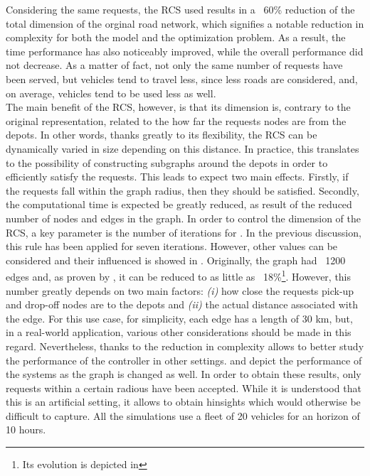  Considering the same requests, the RCS used results in a ~60\% reduction of the total dimension of the orginal road network, which signifies a notable reduction in complexity for both the model and the optimization problem. As a result, the time performance has also noticeably improved, while the overall performance did not decrease. As a matter of fact, not only the same number of requests have been served, but vehicles tend to travel less, since less roads are considered, and, on average, vehicles tend to be used less as well. \\
The main benefit of the RCS, however, is that its dimension is, contrary to the original representation, related to the how far the requests nodes are from the depots. In other words, thanks greatly to its flexibility, the RCS can be dynamically varied in size depending on this distance. In practice, this translates to the possibility of constructing subgraphs around the depots in order to efficiently satisfy the requests. This leads to expect two main effects. Firstly, if the requests fall within the graph radius, then they should be satisfied. Secondly, the computational time is expected be greatly reduced, as result of the reduced number of nodes and edges in the graph. In order to control the dimension of the RCS, a key parameter is the number of iterations for . In the previous discussion, this rule has been applied for seven iterations. However, other values can be considered and their influenced is showed in . Originally, the graph had ~1200 edges and, as proven by , it can be reduced to as little as ~18\%\footnote{Its evolution is depicted in }. However, this number greatly depends on two main factors: \textit{(i)} how close the requests pick-up and drop-off nodes are to the depots and \textit{(ii)} the actual distance associated with the edge. For this use case, for simplicity, each edge has a length of 30 km, but, in a real-world application, various other considerations should be made in this regard. Nevertheless, thanks to the reduction in complexity allows to better study the performance of the controller in other settings.  and  depict the performance of the systems as the graph is changed as well. In order to obtain these results, only requests within a certain radious have been accepted. While it is understood that this is an artificial setting, it allows to obtain hinsights which would otherwise be difficult to capture. All the simulations use a fleet of 20 vehicles for an horizon of 10 hours.\\
